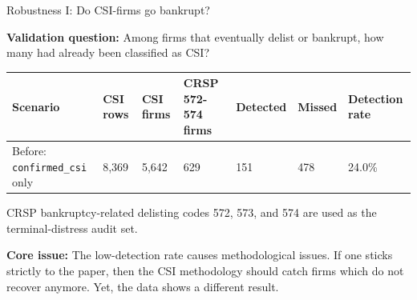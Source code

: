 \documentclass[10pt]{beamer}\usepackage[]{graphicx}\usepackage[table]{xcolor}
\begin{document}
\begin{frame}{Robustness I: Do CSI-firms go bankrupt?}

\textbf{Validation question:} Among firms that eventually delist or bankrupt, how many had already been classified as CSI?

\vspace{0.25em}
\begin{table}[ht]
\centering
\scriptsize
\setlength{\tabcolsep}{2.5pt}
\begin{tabular}{L{3.15cm}R{1.2cm}R{1.0cm}R{1.45cm}R{1.0cm}R{1.0cm}R{1.35cm}}
\toprule
Scenario & CSI rows & CSI firms & CRSP 572-574 firms & Detected & Missed & Detection rate \\
\midrule
Before: \texttt{confirmed\_csi} only & 8,369 & 5,642 & 629 & 151 & 478 & 24.0\% \\
\bottomrule
\end{tabular}
\end{table}

\vspace{0.35em}

{\scriptsize CRSP bankruptcy-related delisting codes 572, 573, and 574 are used as the terminal-distress audit set.}

\vspace{0.45em}

\textbf{Core issue:} The low-detection rate causes methodological issues. If one sticks strictly to the paper,
then the CSI methodology should catch firms which do not recover anymore. Yet, the data shows a different result.


\end{frame}

\end{document}
